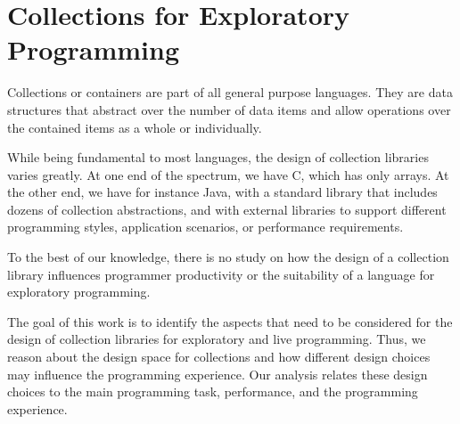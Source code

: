 \documentclass[sigconf, 10pt]{acmart}
\begin{document}
\maketitle


\section{Collections for Exploratory Programming}


Collections or containers are part of all general purpose languages.
They are data structures that abstract over the number of data items
and allow operations over the contained items as a whole or individually.


While being fundamental to most languages,
the design of collection libraries varies greatly.
At one end of the spectrum, we have C, which has only arrays.
At the other end, we have for instance Java,
with a standard library that includes dozens of collection abstractions,
and with external libraries to support different programming styles,
application scenarios, or performance requirements.

To the best of our knowledge,
there is no study on how the design of a collection library
influences programmer productivity
or the suitability of a language for exploratory programming.

The goal of this work is to identify the aspects
that need to be considered for the design of collection libraries
for exploratory and live programming.
%
%
Thus, we reason about the design space for collections
and how different design choices may influence the programming experience.
Our analysis relates these design choices to the main programming task,
performance, and the programming experience.
\end{document}
